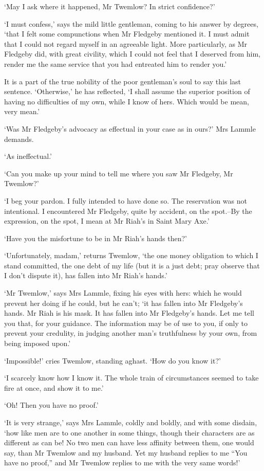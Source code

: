 ‘May I ask where it happened, Mr Twemlow? In strict confidence?’

‘I must confess,’ says the mild little gentleman, coming to his answer
by degrees, ‘that I felt some compunctions when Mr Fledgeby mentioned
it. I must admit that I could not regard myself in an agreeable light.
More particularly, as Mr Fledgeby did, with great civility, which I
could not feel that I deserved from him, render me the same service that
you had entreated him to render you.’

It is a part of the true nobility of the poor gentleman’s soul to say
this last sentence. ‘Otherwise,’ he has reflected, ‘I shall assume the
superior position of having no difficulties of my own, while I know of
hers. Which would be mean, very mean.’

‘Was Mr Fledgeby’s advocacy as effectual in your case as in ours?’ Mrs
Lammle demands.

‘As ineffectual.’

‘Can you make up your mind to tell me where you saw Mr Fledgeby, Mr
Twemlow?’

‘I beg your pardon. I fully intended to have done so. The reservation
was not intentional. I encountered Mr Fledgeby, quite by accident, on
the spot.--By the expression, on the spot, I mean at Mr Riah’s in Saint
Mary Axe.’

‘Have you the misfortune to be in Mr Riah’s hands then?’

‘Unfortunately, madam,’ returns Twemlow, ‘the one money obligation to
which I stand committed, the one debt of my life (but it is a just debt;
pray observe that I don’t dispute it), has fallen into Mr Riah’s hands.’

‘Mr Twemlow,’ says Mrs Lammle, fixing his eyes with hers: which he would
prevent her doing if he could, but he can’t; ‘it has fallen into Mr
Fledgeby’s hands. Mr Riah is his mask. It has fallen into Mr Fledgeby’s
hands. Let me tell you that, for your guidance. The information may be
of use to you, if only to prevent your credulity, in judging another
man’s truthfulness by your own, from being imposed upon.’

‘Impossible!’ cries Twemlow, standing aghast. ‘How do you know it?’

‘I scarcely know how I know it. The whole train of circumstances seemed
to take fire at once, and show it to me.’

‘Oh! Then you have no proof.’

‘It is very strange,’ says Mrs Lammle, coldly and boldly, and with some
disdain, ‘how like men are to one another in some things, though their
characters are as different as can be! No two men can have less affinity
between them, one would say, than Mr Twemlow and my husband. Yet my
husband replies to me “You have no proof,” and Mr Twemlow replies to me
with the very same words!’

